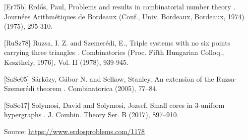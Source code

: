\documentclass{article}
\begin{document}
[Er75b] Erd\H{o}s, Paul, Problems and results in combinatorial number theory . Journ\'{e}es Arithm\'{e}tiques de Bordeaux (Conf., Univ. Bordeaux, Bordeaux, 1974) (1975), 295-310.

[RuSz78] Ruzsa, I. Z. and Szemer\'{e}di, E., Triple systems with no six points carrying three triangles . Combinatorics (Proc. Fifth Hungarian Colloq., Keszthely, 1976), Vol. II (1978), 939-945.

[SaSe05] S\'{a}rk\"ozy, G\'{a}bor N. and Selkow, Stanley, An extension of the {R}uzsa-Szemer\'edi theorem . Combinatorica (2005), 77--84.

[SoSo17] Solymosi, David and Solymosi, Jozsef, Small cores in 3-uniform hypergraphs . J. Combin. Theory Ser. B (2017), 897--910.


\bigskip
\noindent\small{Source: \url{https://www.erdosproblems.com/1178}}
\end{document}
